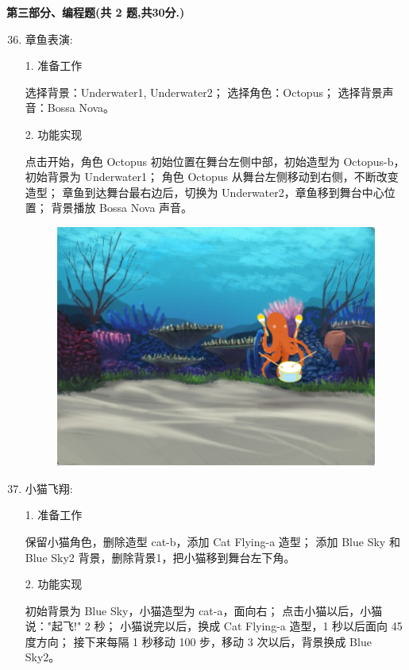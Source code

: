 \documentclass[10pt, a4paper]{article}
\begin{document}
    \newpage
    {\noindent \textbf{第三部分、编程题(共 2 题,共30分.)}}
    \begin{enumerate}
        \setcounter{enumi}{35}
        
        \item 章鱼表演:
        
        1. 准备工作
        \begin{tasks}[label = (\arabic*)]
            \task 选择背景：Underwater1, Underwater2；
            \task 选择角色：Octopus；
            \task 选择背景声音：Bossa Nova。
        \end{tasks}
        2. 功能实现
        \begin{tasks}[label = (\arabic*)]
            \task 点击开始，角色 Octopus 初始位置在舞台左侧中部，初始造型为 Octopus-b，初始背景为 Underwater1；
            \task 角色 Octopus 从舞台左侧移动到右侧，不断改变造型；
            \task 章鱼到达舞台最右边后，切换为 Underwater2，章鱼移到舞台中心位置；
            \task 背景播放 Bossa Nova 声音。
        \end{tasks}
        \begin{figure}[htbp]
            \centering
            \includegraphics[width=.26\textwidth]{36.png}
        \end{figure}

        \item 小猫飞翔:
        
        1. 准备工作
        \begin{tasks}[label = (\arabic*)]
            \task 保留小猫角色，删除造型 cat-b，添加 Cat Flying-a 造型；
            \task 添加 Blue Sky 和 Blue Sky2 背景，删除背景1，把小猫移到舞台左下角。
        \end{tasks}
        2. 功能实现
        \begin{tasks}[label = (\arabic*)]
            \task 初始背景为 Blue Sky，小猫造型为 cat-a，面向右；
            \task 点击小猫以后，小猫说："起飞!" 2 秒；
            \task 小猫说完以后，换成 Cat Flying-a 造型，1 秒以后面向 45 度方向；
            \task 接下来每隔 1 秒移动 100 步，移动 3 次以后，背景换成 Blue Sky2。
        \end{tasks}


\end{enumerate}
\end{document}

